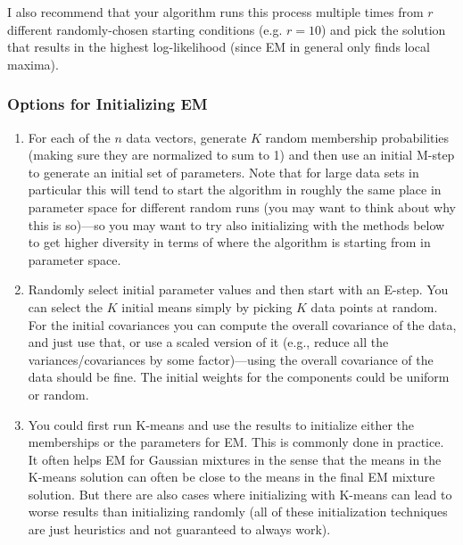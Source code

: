 \documentclass[11pt,psfig]{article}
\begin{document}
I also recommend that your algorithm runs this process multiple times from $r$ different
randomly-chosen starting conditions (e.g. $r=10$) and pick the solution
that results in the highest log-likelihood (since EM
in general only finds local maxima).  

\subsubsection*{\bf Options for Initializing EM}
\begin{enumerate}
\item For each of the $n$ data vectors, generate $K$ random membership probabilities (making sure they are normalized to sum to 1) and then use an initial M-step to generate an initial set of parameters. Note that for large data sets in particular this will tend to start the algorithm in roughly the same place in parameter space for different random runs (you may want to think about why this is so)---so you may want to try also initializing with the methods below to get higher diversity in terms of where the algorithm is starting from in parameter space.
\item Randomly select initial parameter values and then start with an E-step. You can select the $K$ initial means simply by picking $K$ data points at random. For the initial covariances you can compute the overall covariance of the data, and just use that, or use a scaled version of it (e.g., reduce all the variances/covariances by some factor)---using the overall covariance of the data should be fine. The initial weights for the components could be uniform or random.
\item You could first run K-means and use the results to initialize either the memberships or the parameters for EM. This is commonly done in practice. It often helps EM for Gaussian mixtures in the sense that the means in the K-means solution can often be close to the means in the final EM mixture solution. But there are also cases where initializing with K-means can lead to worse results than initializing randomly (all of these initialization techniques are just heuristics and not guaranteed to always work).
\end{enumerate}




%
%
\end{document}
